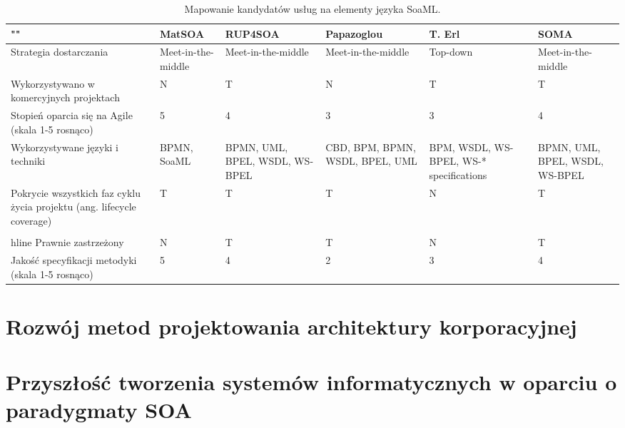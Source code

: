 \begin{table}[!htbp]
\begin{center}
\begin{small}
\begin{supertabular}{|p{4cm}|p{2cm}|p{2cm}|p{2.2cm}|p{2cm}|p{2cm}|}\hline
\textbf{""} & \textbf{MatSOA} & \textbf{RUP4SOA} & \textbf{Papazoglou} & \textbf{T. Erl} & \textbf{SOMA}\\\hline
Strategia dostarczania & Meet-in-the-middle & Meet-in-the-middle & Meet-in-the-middle & Top-down & Meet-in-the-middle\\\hline
Wykorzystywano w komercyjnych projektach & N & T & N & T & T \\\hline
Stopień oparcia się na Agile (skala 1-5 rosnąco) & 5 & 4 & 3 & 3 & 4 \\\hline
Wykorzystywane języki i techniki & BPMN, SoaML & BPMN, UML, BPEL, WSDL, WS-BPEL & CBD, BPM, BPMN, WSDL, BPEL, UML & BPM, WSDL, WS-BPEL, WS-* specifications & BPMN, UML, BPEL, WSDL, WS-BPEL \\\hline
Pokrycie wszystkich faz cyklu życia projektu (ang. lifecycle coverage) & T & T & T & N & T \\\hline\\hline
Prawnie zastrzeżony & N & T & T & N & T \\\hline
Jakość specyfikacji metodyki (skala 1-5 rosnąco) & 5 & 4 & 2 & 3 & 4 \\\hline
\end{supertabular}
\end{small}
\end{center}
 \caption{Mapowanie kandydatów usług na elementy języka SoaML.}
 \label{tabela_methods_comparison}
\end{table}

\section{Rozwój metod projektowania architektury korporacyjnej}
\section{Przyszłość tworzenia systemów informatycznych w oparciu o paradygmaty SOA}
